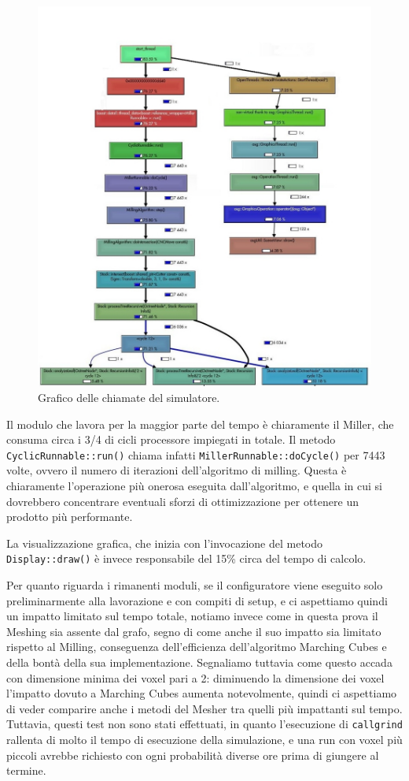 \begin{figure}[htp]
	\centering
	\includegraphics[width=.97\textwidth]{./img/callgraph.jpg}
	\caption{Grafico delle chiamate del simulatore.}
	\label{fig:callgraph}
\end{figure}

Il modulo che lavora per la maggior parte del tempo è chiaramente il Miller, che consuma circa i 3/4 di cicli processore impiegati in totale. Il metodo \texttt{CyclicRunnable::run()} chiama infatti \texttt{MillerRunnable::doCycle()} per 7443 volte, ovvero il numero di iterazioni dell'algoritmo di milling. Questa è chiaramente l'operazione più onerosa eseguita dall'algoritmo, e quella in cui si dovrebbero concentrare eventuali sforzi di ottimizzazione per ottenere un prodotto più performante.

La visualizzazione grafica, che inizia con l'invocazione del metodo \texttt{Display::draw()} è invece responsabile del 15\% circa del tempo di calcolo.

Per quanto riguarda i rimanenti moduli, se il configuratore viene eseguito solo preliminarmente alla lavorazione e con compiti di setup, e ci aspettiamo quindi un impatto limitato sul tempo totale, notiamo invece come in questa prova il Meshing sia assente dal grafo, segno di come anche il suo impatto sia limitato rispetto al Milling, conseguenza dell'efficienza dell'algoritmo Marching Cubes e della bontà della sua implementazione. Segnaliamo tuttavia come questo accada con dimensione minima dei voxel pari a 2: diminuendo la dimensione dei voxel l'impatto dovuto a Marching Cubes aumenta notevolmente, quindi ci aspettiamo di veder comparire anche i metodi del Mesher tra quelli più impattanti sul tempo. Tuttavia, questi test non sono stati effettuati, in quanto l'esecuzione di \texttt{callgrind} rallenta di molto il tempo di esecuzione della simulazione, e una run con voxel più piccoli avrebbe richiesto con ogni probabilità diverse ore prima di giungere al termine.

